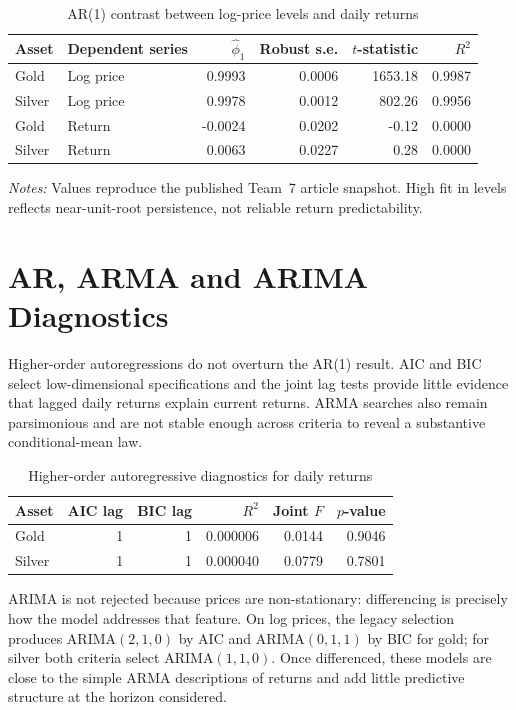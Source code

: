 \begin{table}[htbp]
\centering
\caption{AR(1) contrast between log-price levels and daily returns}
\label{tab:t7-ar1-level-return}
\small
\begin{tabular}{llrrrr}
\toprule
Asset & Dependent series & $\hat\phi_1$ & Robust s.e. & $t$-statistic & $R^2$ \\
\midrule
Gold   & Log price & 0.9993  & 0.0006 & 1653.18 & 0.9987 \\
Silver & Log price & 0.9978  & 0.0012 &  802.26 & 0.9956 \\
Gold   & Return    &-0.0024  & 0.0202 &   -0.12 & 0.0000 \\
Silver & Return    & 0.0063  & 0.0227 &    0.28 & 0.0000 \\
\bottomrule
\end{tabular}
\begin{minipage}{0.90\textwidth}
\footnotesize\emph{Notes:} Values reproduce the published Team~7 article
snapshot. High fit in levels reflects near-unit-root persistence, not reliable
return predictability.
\end{minipage}
\end{table}

\section{AR, ARMA and ARIMA Diagnostics}

Higher-order autoregressions do not overturn the AR(1) result. AIC and BIC
select low-dimensional specifications and the joint lag tests provide little
evidence that lagged daily returns explain current returns. ARMA searches also
remain parsimonious and are not stable enough across criteria to reveal a
substantive conditional-mean law.

\begin{table}[htbp]
\centering
\caption{Higher-order autoregressive diagnostics for daily returns}
\label{tab:t7-arp-diagnostics}
\small
\begin{tabular}{lrrrrr}
\toprule
Asset & AIC lag & BIC lag & $R^2$ & Joint $F$ & $p$-value \\
\midrule
Gold   & 1 & 1 & 0.000006 & 0.0144 & 0.9046 \\
Silver & 1 & 1 & 0.000040 & 0.0779 & 0.7801 \\
\bottomrule
\end{tabular}
\end{table}

ARIMA is not rejected because prices are non-stationary: differencing is
precisely how the model addresses that feature. On log prices, the legacy
selection produces ARIMA$(2,1,0)$ by AIC and ARIMA$(0,1,1)$ by BIC for gold;
for silver both criteria select ARIMA$(1,1,0)$. Once differenced, these models
are close to the simple ARMA descriptions of returns and add little predictive
structure at the horizon considered.

